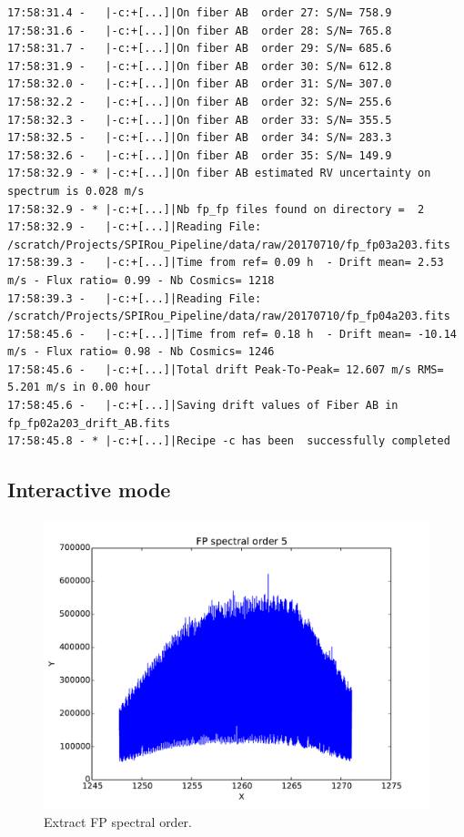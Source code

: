 \begin{lstlisting}[style=text]
17:58:31.4 -   |-c:+[...]|On fiber AB  order 27: S/N= 758.9
17:58:31.6 -   |-c:+[...]|On fiber AB  order 28: S/N= 765.8
17:58:31.7 -   |-c:+[...]|On fiber AB  order 29: S/N= 685.6
17:58:31.9 -   |-c:+[...]|On fiber AB  order 30: S/N= 612.8
17:58:32.0 -   |-c:+[...]|On fiber AB  order 31: S/N= 307.0
17:58:32.2 -   |-c:+[...]|On fiber AB  order 32: S/N= 255.6
17:58:32.3 -   |-c:+[...]|On fiber AB  order 33: S/N= 355.5
17:58:32.5 -   |-c:+[...]|On fiber AB  order 34: S/N= 283.3
17:58:32.6 -   |-c:+[...]|On fiber AB  order 35: S/N= 149.9
17:58:32.9 - * |-c:+[...]|On fiber AB estimated RV uncertainty on spectrum is 0.028 m/s
17:58:32.9 - * |-c:+[...]|Nb fp_fp files found on directory =  2
17:58:32.9 -   |-c:+[...]|Reading File: /scratch/Projects/SPIRou_Pipeline/data/raw/20170710/fp_fp03a203.fits
17:58:39.3 -   |-c:+[...]|Time from ref= 0.09 h  - Drift mean= 2.53 m/s - Flux ratio= 0.99 - Nb Cosmics= 1218
17:58:39.3 -   |-c:+[...]|Reading File: /scratch/Projects/SPIRou_Pipeline/data/raw/20170710/fp_fp04a203.fits
17:58:45.6 -   |-c:+[...]|Time from ref= 0.18 h  - Drift mean= -10.14 m/s - Flux ratio= 0.98 - Nb Cosmics= 1246
17:58:45.6 -   |-c:+[...]|Total drift Peak-To-Peak= 12.607 m/s RMS= 5.201 m/s in 0.00 hour
17:58:45.6 -   |-c:+[...]|Saving drift values of Fiber AB in fp_fp02a203_drift_AB.fits
17:58:45.8 - * |-c:+[...]|Recipe -c has been  successfully completed
\end{lstlisting}

\subsection{Interactive mode}

\begin{figure}
\begin{center}
\includegraphics[width=.8\textwidth]{figures/cal_DRIFT_RAW_spirou_1}
\caption{Extract FP spectral order. \label{figure:cal_DRIFT_RAW_spirou_1}}
\end{center}
\end{figure}

